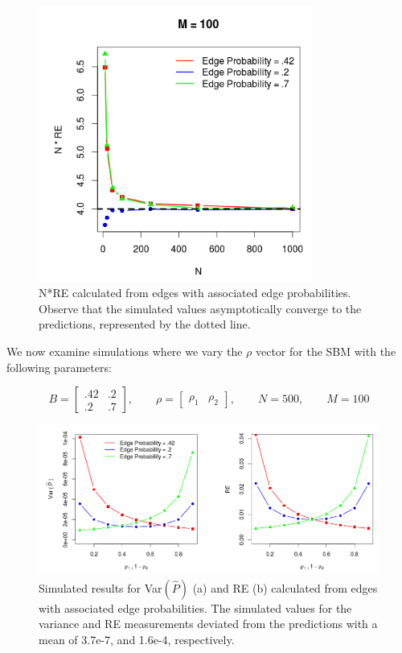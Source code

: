 	\begin{figure}[!htb]
		\centering
		\includegraphics[width=9cm]{RE.PNG}
		\caption{N*RE calculated from edges with associated edge probabilities.  Observe that the simulated values asymptotically converge to the predictions, represented by the dotted line.}
		\label{fig:plot1}
	\end{figure}
	\newpage
	We now examine simulations where we vary the $\rho$ vector for the SBM with the following parameters:
	
		\begin{equation*}
		B = \begin{bmatrix}
		.42 & .2 \\
		.2 & .7 
		\end{bmatrix}
		,\qquad \rho = \begin{bmatrix}
			\rho_1 & \rho_2
		\end{bmatrix}
		,\qquad N = 500,\qquad M = 100
		\end{equation*}
	
	\begin{figure}[!htb]
		\centering
		\includegraphics[width=16cm]{VarRE.PNG}
		\caption{Simulated results for Var$(\hat{P})$ (a) and RE (b) calculated from edges with associated edge probabilities. The simulated values for the variance and RE measurements deviated from the predictions with a mean of 3.7e-7, and 1.6e-4, respectively.}
		\label{fig:plot1}
	\end{figure}
	\newpage